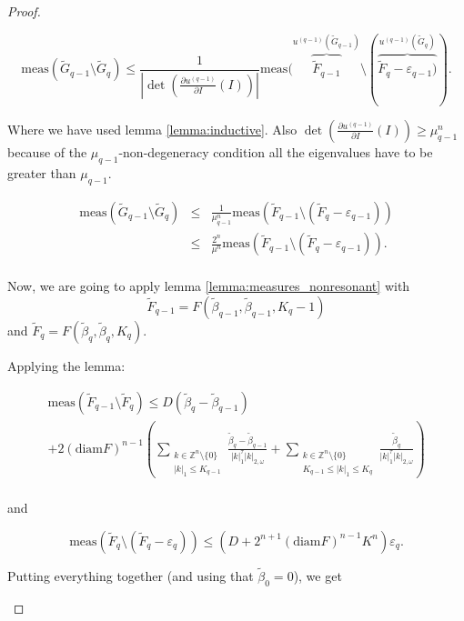 \begin{proof}
\begin{enumerate}
$$\text{meas}(\tilde G_{q-1}\setminus \tilde G_q) \leq \frac{1}{|\det(\frac{\partial u^{(q-1)}}{\partial I}(I))|} \text{meas}(\overbrace{\tilde F_{q-1}}^{u^{(q-1)}(\tilde G_{q-1})}\setminus(\overbrace{\tilde F_q - \varepsilon_{q-1})}^{u^{(q-1)}(\tilde G_q)}).$$

Where we have used lemma \ref{lemma:inductive}. Also $\det(\frac{\partial u^{(q-1)}}{\partial I}(I)) \geq \mu_{q-1}^n$ because of the $\mu_{q-1}$-non-degeneracy condition all the eigenvalues have to be greater than $\mu_{q-1}$.

$$
\begin{array}{rcl}
\text{meas}(\tilde G_{q-1} \setminus \tilde G_q) & \leq & \frac{1}{\mu_{q-1}^n}\text{meas}(\tilde F_{q-1} \setminus(\tilde F_q - \varepsilon_{q-1}))\\
 & \leq& \frac{2^n}{\mu^n} \text{meas}(\tilde F_{q-1} \setminus(\tilde F_q - \varepsilon_{q-1})).\\
\end{array}
$$

Now, we are going to apply lemma \ref{lemma:measures_nonresonant} with 
$$\tilde F_{q-1} = F(\tilde \beta_{q-1}, \tilde \beta_{q-1}, K_q-1)$$
and $\tilde F_q = F(\tilde \beta_q, \tilde \beta_q, K_q)$.


Applying the lemma:

$$
\begin{array}{lcl}
\displaystyle \text{meas}(\tilde F_{q-1} \setminus \tilde F_q)  \leq  \displaystyle D(\tilde \beta_q - \tilde \beta_{q-1})\\
 \displaystyle + 2(\text{diam} F)^{n-1}\left(\sum_{\substack{k\in\mathbb{Z}^n\setminus\{0\} \\ |k|_1 \leq K_{q-1}}} \frac{\tilde \beta_q - \tilde \beta_{q-1}}{|k|_1^\tau |k|_{2,\omega}} + \sum_{\substack{k\in\mathbb{Z}^n\setminus\{0\} \\ K_{q-1} \leq |k|_1 \leq K_{q}}} \frac{\tilde \beta_q}{|k|_1^\tau |k|_{2,\omega}} \right)\\
\end{array}
$$

and

$$
\text{meas}(\tilde F_q \setminus (\tilde F_q - \varepsilon_q)) \leq (D + 2^{n+1}(\text{diam} F)^{n-1} K^n)\varepsilon_q.
$$

Putting everything together (and using that $\tilde \beta_0 = 0$), we get


\end{enumerate}
\end{proof}
